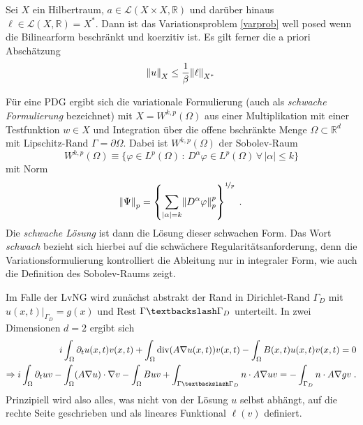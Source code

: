 \begin{satz}\label{laxmilgram}
  Sei $X$ ein Hilbertraum, $a \in \mathcal{L}(X\times X, \mathbb{R})$ und darüber hinaus ${\ell\in\mathcal{L}(X,\mathbb{R})=X^*}$. Dann ist das Variationsproblem \ref{varprob} well posed wenn die Bilinearform beschränkt und koerzitiv ist. Es gilt ferner die a priori Abschätzung
  \begin{equation}
    \norm{u}_X \leq \frac{1}{\beta} \norm{\ell}_{X^*}
  \end{equation}
\end{satz}
 Für eine PDG ergibt sich die variationale Formulierung (auch als \emph{schwache Formulierung} bezeichnet) mit ${X=W^{k,p}(\Omega)}$ aus einer Multiplikation mit einer Testfunktion ${w\in X}$ und Integration über die offene bschränkte Menge ${\Omega \subset \mathbb{R}^d}$ mit Lipschitz-Rand $\Gamma = \partial\Omega$.
 Dabei ist ${W^{k,p}(\Omega)}$ der Sobolev-Raum
 \begin{equation*}
   W^{k,p}(\Omega) \equiv \{ \varphi \in L^p(\Omega) \, : \, D^{\alpha}\varphi \in L^p(\Omega) \, \forall \, |\alpha| \leq k\}
 \end{equation*}
 mit Norm
 \begin{equation*}
   \norm{\Psi}_p = \left\{ \sum_{|\alpha|=k}\norm{D^{\alpha}\varphi}_p^p\right\}^{\nicefrac{1}{p}} \; .
 \end{equation*}
 Die \emph{schwache Lösung} ist dann die Lösung dieser schwachen Form. Das Wort \emph{schwach} bezieht sich hierbei auf die schwächere Regularitätsanforderung, denn die Variationsformulierung kontrolliert die Ableitung nur in integraler Form, wie auch die Definition des Sobolev-Raums zeigt.

 Im Falle der LvNG wird zunächst abstrakt der Rand in Dirichlet-Rand $\Gamma_D$ mit ${u(x,t)|_{\Gamma_D} = g(x)}$ und Rest ${\Gamma\textbackslash\Gamma_D}$ unterteilt. In zwei Dimensionen $d=2$ ergibt sich
 \begin{align*}
              i \int_{\Omega} \partial_t u(x,t) v(x,t) + \int_{\Omega}\operatorname{div}(A\nabla u(x,t)) v(x,t) - \int_{\Omega}B(x,t) u(x,t) v(x,t) = 0 \\
  \Rightarrow i \int_{\Omega} \partial_t u v - \int_{\Omega}(A\nabla u)\cdot\nabla v - \int_{\Omega}B u v + \int_{\Gamma\textbackslash\Gamma_D} n \cdot A\nabla u v = - \int_{\Gamma_D} n \cdot A\nabla g v \; .
\end{align*}
 Prinzipiell wird also alles, was nicht von der Lösung $u$ selbst abhängt, auf die rechte Seite geschrieben und als lineares Funktional $\ell(v)$ definiert.

